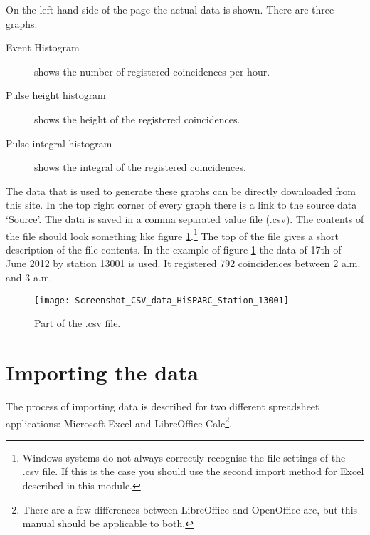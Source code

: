 On the left hand side of the page the actual data is shown. There are three graphs:
\begin{description}
\item[Event Histogram] shows the number of registered coincidences per hour.
\item[Pulse height histogram] shows the height of the registered coincidences.
\item[Pulse integral histogram] shows the integral of the registered coincidences.
\end{description}

The data that is used to generate these graphs can be directly downloaded from this site. In the top right corner of every graph there is a link to the source data `Source'. The data is saved in a comma separated value file (.csv). The contents of the file should look something like figure \ref{fig:data_CSV}.\footnote{Windows systems do not always correctly recognise the file settings of the .csv file. If this is the case you should use the second import method for Excel described in this module.} The top of the file gives a short description of the file contents. In the example of figure \ref{fig:data_CSV} the data of 17th of June 2012 by station 13001 is used. It registered 792 coincidences between 2 a.m. and 3 a.m.

\begin{figure}\begin{center}
\texttt{[image: Screenshot\_CSV\_data\_HiSPARC\_Station\_13001]}
\caption{Part of the .csv file.}\label{fig:data_CSV}
\end{center}\end{figure} 

\section{Importing the data}
The process of importing data is described for two different spreadsheet applications: Microsoft Excel and LibreOffice Calc\footnote{There are a few differences between LibreOffice and OpenOffice are, but this manual should be applicable to both.}.

